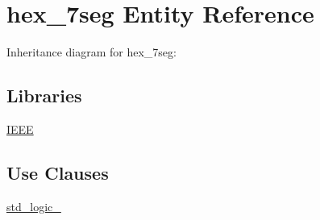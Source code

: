 \hypertarget{classhex__7seg}{}\section{hex\+\_\+7seg Entity Reference}
\label{classhex__7seg}


Inheritance diagram for hex\+\_\+7seg\+:
\subsection*{Libraries}
 \begin{DoxyCompactItemize}
\item 
\hyperlink{classhex__7seg_ae4f03c286607f3181e16b9aa12d0c6d4}{I\+E\+E\+E} 
\end{DoxyCompactItemize}
\subsection*{Use Clauses}
 \begin{DoxyCompactItemize}
\item 
\hyperlink{classhex__7seg_acd03516902501cd1c7296a98e22c6fcb}{std\+\_\+logic\+\_}   
\end{DoxyCompactItemize}
